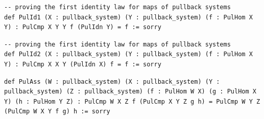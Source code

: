 \documentclass{book}
\theoremstyle{definition}
\newcounter{lcounter}
\begin{document}
\begin{center} \begin{tcolorbox}[width=5in,colback={white},title={\begin{center}\texttt{Lean \thelcounter} \addtocounter{lcounter}{1} \end{center}},colbacktitle=Blue,coltitle=black] \begin{verbatim}
-- proving the first identity law for maps of pullback systems
def PulId1 (X : pullback_system) (Y : pullback_system) (f : PulHom X Y) : PulCmp X Y Y f (PulIdn Y) = f := sorry
\end{verbatim} \end{tcolorbox} \end{center}
\begin{center} \begin{tcolorbox}[width=5in,colback={white},title={\begin{center}\texttt{Lean \thelcounter} \addtocounter{lcounter}{1} \end{center}},colbacktitle=Blue,coltitle=black] \begin{verbatim}
-- proving the first identity law for maps of pullback systems
def PulId2 (X : pullback_system) (Y : pullback_system) (f : PulHom X Y) : PulCmp X X Y (PulIdn X) f = f := sorry
\end{verbatim}

 \end{tcolorbox} \end{center}
\begin{center} \begin{tcolorbox}[width=5in,colback={white},title={\begin{center}\texttt{Lean \thelcounter} \addtocounter{lcounter}{1} \end{center}},colbacktitle=Blue,coltitle=black] \begin{verbatim}
def PulAss (W : pullback_system) (X : pullback_system) (Y : pullback_system) (Z : pullback_system) (f : PulHom W X) (g : PulHom X Y) (h : PulHom Y Z) : PulCmp W X Z f (PulCmp X Y Z g h) = PulCmp W Y Z (PulCmp W X Y f g) h := sorry
\end{verbatim} \end{tcolorbox} \end{center}
\end{document}
